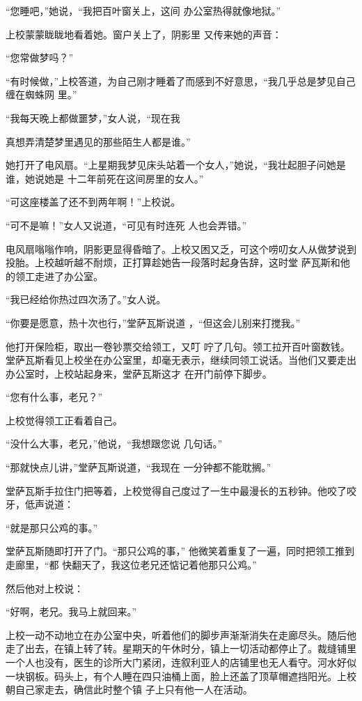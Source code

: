 \documentclass{article}
\begin{document}
“您睡吧，”她说，“我把百叶窗关上，这间
办公室热得就像地狱。” 

上校蒙蒙眬眬地看着她。窗户关上了，阴影里
又传来她的声音： 


“您常做梦吗？” 

“有时候做，”上校答道，为自己刚才睡着了而感到不好意思，“我几乎总是梦见自己缠在蜘蛛网
里。” 

“我每天晚上都做噩梦，”女人说，“现在我

\newpage
真想弄清楚梦里遇见的那些陌生人都是谁。” 

她打开了电风扇。“上星期我梦见床头站着一个女人，”她说，“我壮起胆子问她是谁，她说她是
十二年前死在这间房里的女人。” 


“可这座楼盖了还不到两年啊！”上校说。 

“可不是嘛！”女人又说道，“可见有时连死
人也会弄错。” 

电风扇嗡嗡作响，阴影更显得昏暗了。上校又困又乏，可这个唠叨女人从做梦说到投胎。上校越听越不耐烦，正打算趁她告一段落时起身告辞，这时堂
萨瓦斯和他的领工走进了办公室。 


“我已经给你热过四次汤了。”女人说。 

“你要是愿意，热十次也行，”堂萨瓦斯说道
，“但这会儿别来打搅我。” 

他打开保险柜，取出一卷钞票交给领工，又叮
\newpage
咛了几句。领工拉开百叶窗数钱。堂萨瓦斯看见上校坐在办公室里，却毫无表示，继续同领工说话。当他们又要走出办公室时，上校站起身来，堂萨瓦斯这才
在开门前停下脚步。 


“您有什么事，老兄？” 


上校觉得领工正看着自己。 

“没什么大事，老兄，”他说，“我想跟您说
几句话。” 

“那就快点儿讲，”堂萨瓦斯说道，“我现在
一分钟都不能耽搁。” 

堂萨瓦斯手拉住门把等着，上校觉得自己度过了一生中最漫长的五秒钟。他咬了咬牙，低声说道：


“就是那只公鸡的事。” 

堂萨瓦斯随即打开了门。“那只公鸡的事，”
\newpage
他微笑着重复了一遍，同时把领工推到走廊里，“都
快翻天了，我这位老兄还惦记着他那只公鸡。” 


然后他对上校说： 


“好啊，老兄。我马上就回来。” 

上校一动不动地立在办公室中央，听着他们的脚步声渐渐消失在走廊尽头。随后他走了出去，在镇上转了转。星期天的午休时分，镇上一切活动都停止了。裁缝铺里一个人也没有，医生的诊所大门紧闭，连叙利亚人的店铺里也无人看守。河水好似一块钢板。码头上，有个人睡在四只油桶上面，脸上还盖了顶草帽遮挡阳光。上校朝自己家走去，确信此时整个镇
子上只有他一人在活动。 
\end{document}

